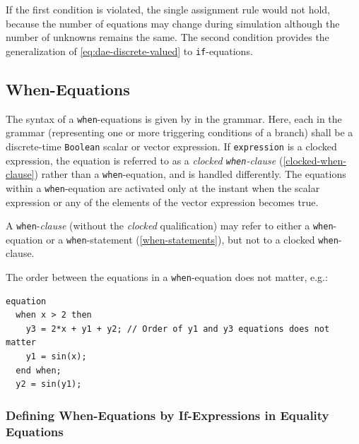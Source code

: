 \begin{nonnormative}
If the first condition is violated, the single assignment rule would not hold, because the number of equations may change during simulation although the number of unknowns remains the same.
The second condition provides the generalization of \eqref{eq:dae-discrete-valued} to \lstinline!if!-equations.
\end{nonnormative}


\subsection{When-Equations}\label{when-equations}

The syntax of a \lstinline!when!-equations is given by  in the grammar.
Here, each  in the grammar (representing one or more triggering conditions of a branch) shall be a discrete-time \lstinline!Boolean! scalar or vector expression.
If \lstinline!expression! is a clocked expression, the equation is referred to as a \emph{clocked \lstinline!when!-clause} (\cref{clocked-when-clause}) rather than a \lstinline!when!-equation, and is handled differently.
The equations within a \lstinline!when!-equation are activated only at the instant when the scalar expression or any of the elements of the vector expression becomes true.

A \lstinline!when!-\emph{clause} (without the \emph{clocked} qualification) may refer to either a \lstinline!when!-equation or a \lstinline!when!-statement (\cref{when-statements}), but not to a clocked \lstinline!when!-clause.

\begin{example}
The order between the equations in a \lstinline!when!-equation does not matter, e.g.:
\begin{lstlisting}[language=modelica]
equation
  when x > 2 then
    y3 = 2*x + y1 + y2; // Order of y1 and y3 equations does not matter
    y1 = sin(x);
  end when;
  y2 = sin(y1);
\end{lstlisting}
\end{example}


\subsubsection{Defining When-Equations by If-Expressions in Equality Equations}\label{defining-when-equations-by-if-expressions-in-equality-equations}

